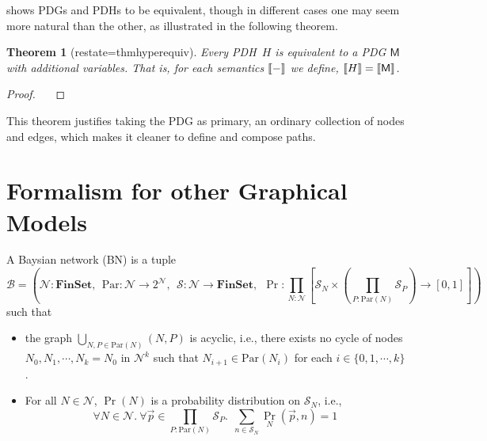 \documentclass{article}
\theoremstyle{plain}
\newtheorem{theorem}{Theorem}[section]
\theoremstyle{definition}
\theoremstyle{remark}
\DeclarePairedDelimiter{\bbr}{\llbracket}{\rrbracket}
\newcommand{\todo}[1]{{\color{red}\ \!\Large\smash{\textbf{[}}{\normalsize\textsc{todo:} #1}\ \!\smash{\textbf{]}}}}
\newcommand{\sfM}{\mathsf M}
\newcommand{\MNH}{PDH}
\numberwithin{equation}{section}
\begin{document}
	 shows PDGs and \MNH s to be equivalent, though in different cases one may seem more natural than the other, as illustrated in the following theorem.
	
	\begin{theorem}[restate=thmhyperequiv]\label{thm:hyperequiv}
		Every \MNH\ $H$ is equivalent to a PDG $\sfM$ with additional variables. That is, for each semantics $\bbr{-}$ we define, $\bbr{H} = \bbr{\sfM}$.
	\end{theorem}
	\begin{proof}
		\todo{}
	\end{proof}
	
	This theorem justifies taking the PDG as primary, an ordinary collection of nodes and edges, which makes it cleaner to define and compose paths. 

	
	\section{Formalism for other Graphical Models}
	\begin{defn}
		A Baysian network (BN) is a tuple
		\[
		\mathcal B = \left(\mathcal N : \mathbf{FinSet}, ~~\mathrm{Par}: \mathcal N \to 2^{\mathcal N},~~ \mathcal S: \mathcal N \to \mathbf{FinSet},~~\Pr: \prod_{N : \mathcal N}  \left[ \mathcal S_N \times \left(\prod_{P : \mathrm{Par}(N)} \mathcal S_P\right)  \to [0,1] \right] \right)
		\]
		such that
		\begin{itemize}[nosep]
			\item the graph $\bigcup_{N, P \in \mathrm{Par}(N)}(N, P)$ is acyclic, i.e., there exists no cycle of nodes $N_0, N_1, \cdots, N_k = N_0$ in $\mathcal N^k$ such that $N_{i+1} \in \mathrm{Par}(N_i)$ for each $i \in \{0, 1, \cdots, k\}$.
			\item For all $N \in \mathcal N$, $\Pr(N)$ is a probability distribution on $\mathcal S_N$, i.e., 
			\[ \forall N\in \mathcal N.~\forall \vec{p} \in {\prod_{P : \mathrm{Par}(N)} \mathcal S_P}.~~ \sum_{n \in \mathcal S_{N}} \Pr_N(\vec{p}, n) = 1\]
		\end{itemize}
	\end{defn}
	
\end{document}
